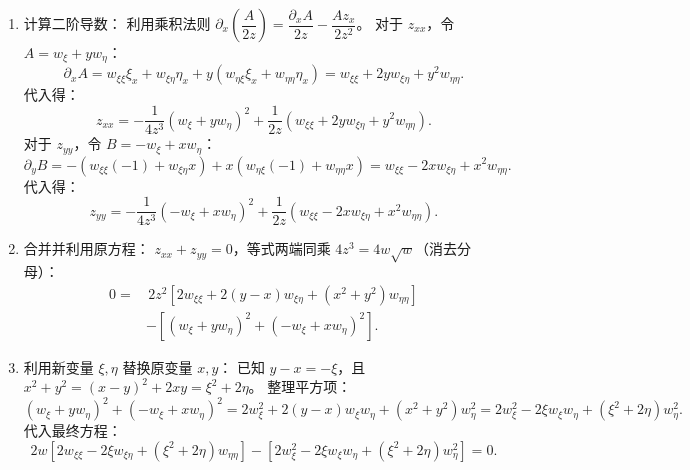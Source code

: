 \documentclass[lang=cn,11pt]{elegantbook}
\begin{document}
\begin{solution}
\begin{enumerate}
\begin{enumerate}
      \item 计算二阶导数：
      利用乘积法则 $\partial_x \left( \dfrac{A}{2z} \right) = \dfrac{\partial_x A}{2z} - \dfrac{A z_x}{2z^2}$。
      对于 $z_{xx}$，令 $A = w_\xi + y w_\eta$：
      \[
      \partial_x A = w_{\xi\xi} \xi_x + w_{\xi\eta} \eta_x + y(w_{\eta\xi} \xi_x + w_{\eta\eta} \eta_x) = w_{\xi\xi} + 2y w_{\xi\eta} + y^2 w_{\eta\eta}.
      \]
      代入得：
      \[
      z_{xx} = -\frac{1}{4z^3}(w_\xi + y w_\eta)^2 + \frac{1}{2z}(w_{\xi\xi} + 2y w_{\xi\eta} + y^2 w_{\eta\eta}).
      \]
      对于 $z_{yy}$，令 $B = -w_\xi + x w_\eta$：
      \[
      \partial_y B = -(w_{\xi\xi}(-1) + w_{\xi\eta} x) + x(w_{\eta\xi}(-1) + w_{\eta\eta} x) = w_{\xi\xi} - 2x w_{\xi\eta} + x^2 w_{\eta\eta}.
      \]
      代入得：
      \[
      z_{yy} = -\frac{1}{4z^3}(-w_\xi + x w_\eta)^2 + \frac{1}{2z}(w_{\xi\xi} - 2x w_{\xi\eta} + x^2 w_{\eta\eta}).
      \]
      
      \item 合并并利用原方程：
      $z_{xx}+z_{yy}=0$，等式两端同乘 $4z^3 = 4w\sqrt{w}$（消去分母）：
      \begin{align*}
      0 = &\, 2z^2 \left[ 2w_{\xi\xi} + 2(y-x)w_{\xi\eta} + (x^2+y^2)w_{\eta\eta} \right] \\[4pt]
      &- \left[ (w_\xi + y w_\eta)^2 + (-w_\xi + x w_\eta)^2 \right].
      \end{align*}
      
      \item 利用新变量 $\xi, \eta$ 替换原变量 $x, y$：
      已知 $y-x = -\xi$，且 $x^2+y^2 = (x-y)^2 + 2xy = \xi^2 + 2\eta$。
      整理平方项：
      \[
      (w_\xi + y w_\eta)^2 + (-w_\xi + x w_\eta)^2 = 2w_\xi^2 + 2(y-x)w_\xi w_\eta + (x^2+y^2)w_\eta^2 = 2w_\xi^2 - 2\xi w_\xi w_\eta + (\xi^2+2\eta)w_\eta^2.
      \]
      代入最终方程：
      \[
      2w \left[ 2w_{\xi\xi} - 2\xi w_{\xi\eta} + (\xi^2+2\eta)w_{\eta\eta} \right] - \left[ 2w_\xi^2 - 2\xi w_\xi w_\eta + (\xi^2+2\eta)w_\eta^2 \right] = 0.
      \]
  \end{enumerate}


\end{enumerate}
\end{solution}
\end{document}
